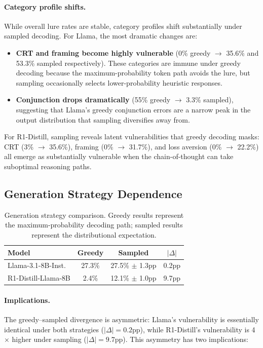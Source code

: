 \documentclass{article}
\begin{document}
\paragraph{Category profile shifts.}
While overall lure rates are stable, category profiles shift
substantially under sampled decoding.  For Llama, the most dramatic
changes are:
\begin{itemize}[leftmargin=*,itemsep=2pt]
  \item \textbf{CRT and framing become highly vulnerable} (0\%
  greedy $\to$ 35.6\% and 53.3\% sampled respectively).  These
  categories are immune under greedy decoding because the
  maximum-probability token path avoids the lure, but sampling
  occasionally selects lower-probability heuristic responses.
  \item \textbf{Conjunction drops dramatically} (55\% greedy $\to$
  3.3\% sampled), suggesting that Llama's greedy conjunction errors
  are a narrow peak in the output distribution that sampling
  diversifies away from.
\end{itemize}

For R1-Distill, sampling reveals latent vulnerabilities that
greedy decoding masks: CRT (3\% $\to$ 35.6\%), framing
(0\% $\to$ 31.7\%), and loss aversion (0\% $\to$ 22.2\%)
all emerge as substantially vulnerable when the chain-of-thought
can take suboptimal reasoning paths.

\subsection{Generation Strategy Dependence}
\label{sec:app_gen_dependence}

\begin{table}[ht]
\centering
\caption{Generation strategy comparison.  Greedy results represent
  the maximum-probability decoding path; sampled results represent
  the distributional expectation.}
\label{tab:gen_strategy}
\vspace{4pt}
\small
\begin{tabular}{lccc}
\toprule
\textbf{Model} & \textbf{Greedy} & \textbf{Sampled} & \textbf{$|\Delta|$} \\
\midrule
Llama-3.1-8B-Inst. & 27.3\% & 27.5\% $\pm$ 1.3pp & 0.2pp \\
R1-Distill-Llama-8B & 2.4\% & 12.1\% $\pm$ 1.0pp & 9.7pp \\
\bottomrule
\end{tabular}
\end{table}

\paragraph{Implications.}
The greedy--sampled divergence is asymmetric: Llama's vulnerability
is essentially identical under both strategies ($|\Delta| = 0.2$pp),
while R1-Distill's vulnerability is 4$\times$ higher under sampling
($|\Delta| = 9.7$pp).  This asymmetry has two implications:
\end{document}
